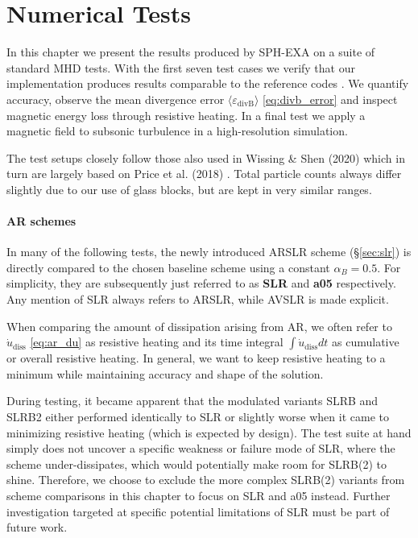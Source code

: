 \section{Numerical Tests}
\label{sec:numerical_tests}
In this chapter we present the results produced by SPH-EXA on a suite of standard MHD tests. With the first seven test cases we verify that our implementation produces results comparable to the reference codes \cite{WissingShen2020, Price2018}. We quantify accuracy, observe the mean divergence error $\langle \varepsilon_{\text{divB}}\rangle$ \eqref{eq:divb_error} and inspect magnetic energy loss through resistive heating. In a final test we apply a magnetic field to subsonic turbulence in a high-resolution simulation.

The test setups closely follow those also used in Wissing \& Shen (2020) \cite{WissingShen2020} which in turn are largely based on Price et al. (2018) \cite{Price2018}. Total particle counts always differ slightly due to our use of glass blocks, but are kept in very similar ranges.

\paragraph{AR schemes}
In many of the following tests, the newly introduced ARSLR scheme (§\ref{sec:slr}) is directly compared to the chosen baseline scheme using a constant $\alpha_B = 0.5$. For simplicity, they are subsequently just referred to as \textbf{SLR} and \textbf{a05} respectively. Any mention of SLR always refers to ARSLR, while AVSLR is made explicit. 

When comparing the amount of dissipation arising from AR, we often refer to $\dot u_\mathrm{diss}$ \eqref{eq:ar_du} as resistive heating and its time integral $\int \dot u_\mathrm{diss} dt$ as cumulative or overall resistive heating. In general, we want to keep resistive heating to a minimum while maintaining accuracy and shape of the solution. 

During testing, it became apparent that the modulated variants SLRB and SLRB2 either performed identically to SLR or slightly worse when it came to minimizing resistive heating (which is expected by design). The test suite at hand simply does not uncover a specific weakness or failure mode of SLR, where the scheme under-dissipates, which would potentially make room for SLRB(2) to shine. Therefore, we choose to exclude the more complex SLRB(2) variants from scheme comparisons in this chapter to focus on SLR and a05 instead. Further investigation targeted at specific potential limitations of SLR must be part of future work. 

